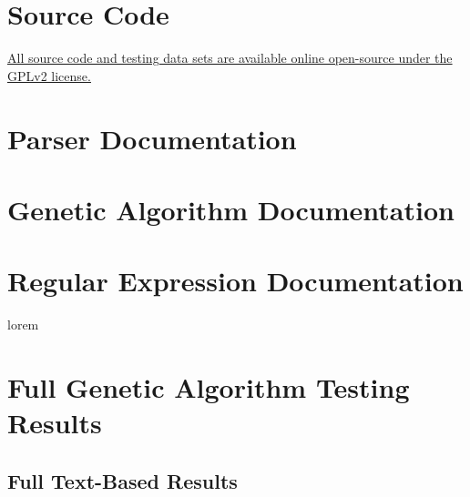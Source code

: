 \begin{appendices}

\chapter{Source Code}

\href{https://github.com/xTVaser/web-threat-thesis}{All source code and testing data sets are available online open-source under the GPLv2 license.}

\chapter{Parser Documentation} \label{app:parserDocumentation}

\chapter{Genetic Algorithm Documentation} \label{app:geneticDocumentation}

\chapter{Regular Expression Documentation} \label{app:regex}
lorem

\chapter{Full Genetic Algorithm Testing Results} \label{app:geneticFullResults}
\section{Full Text-Based Results}

\end{appendices}
